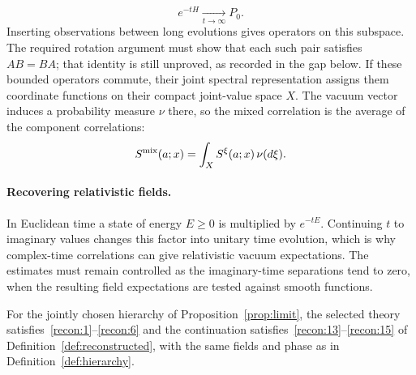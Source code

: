 \begin{equation*}
 e^{-tH}\xrightarrow[t\to\infty]{}P_0.
\end{equation*}
Inserting observations between long evolutions gives operators on this subspace. The required rotation argument must show that each such pair satisfies $AB=BA$; that identity is still unproved, as recorded in the gap below.
If these bounded operators commute, their joint spectral representation assigns them coordinate functions on their compact joint-value space $X$. The vacuum vector induces a probability measure $\nu$ there, so the mixed correlation is the average of the component correlations:
\begin{equation*}
 S^{\mathrm{mix}}(a;x)=\int_X S^\xi(a;x)\,\nu(d\xi).
\end{equation*}


\paragraph{Recovering relativistic fields.}
In Euclidean time a state of energy $E\ge0$ is multiplied by $e^{-tE}$.
Continuing $t$ to imaginary values changes this factor into unitary time evolution, which is why complex-time correlations can give relativistic vacuum expectations.
The estimates must remain controlled as the imaginary-time separations tend to zero, when the resulting field expectations are tested against smooth functions.

\begin{proposition}\label{prop:reconstruction}
For the jointly chosen hierarchy of Proposition~\ref{prop:limit}, the selected theory satisfies~\ref{recon:1}--\ref{recon:6} and the continuation satisfies~\ref{recon:13}--\ref{recon:15} of Definition~\ref{def:reconstructed}, with the same fields and phase as in Definition~\ref{def:hierarchy}.
\end{proposition}

